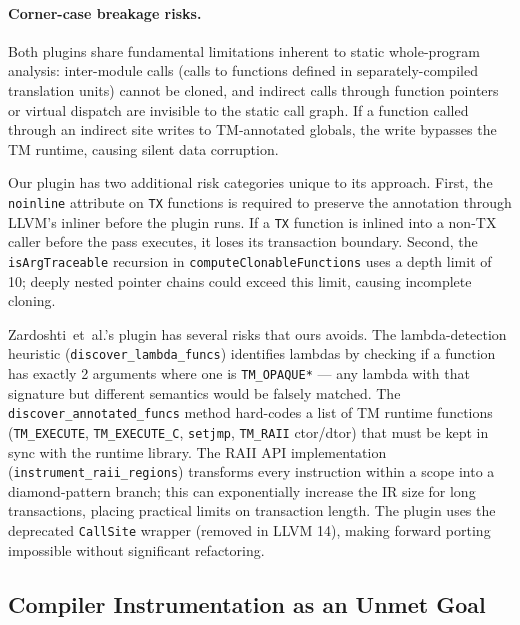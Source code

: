 \documentclass[article,12pt]{article}
\newcommand{\ZardoshtiEtAl}{Zardoshti~et~al.}
\begin{document}
\paragraph{Corner-case breakage risks.}
Both plugins share fundamental limitations inherent to static whole-program
analysis: inter-module calls (calls to functions defined in separately-compiled
translation units) cannot be cloned, and indirect calls through function
pointers or virtual dispatch are invisible to the static call graph.  If a
function called through an indirect site writes to TM-annotated globals, the
write bypasses the TM runtime, causing silent data corruption.

Our plugin has two additional risk categories unique to its approach.
First, the \texttt{noinline} attribute on \texttt{TX} functions is required
to preserve the annotation through LLVM's inliner before the plugin runs.
If a \texttt{TX} function is inlined into a non-TX caller before the pass
executes, it loses its transaction boundary.  Second, the
\texttt{isArgTraceable} recursion in \texttt{computeClonableFunctions} uses
a depth limit of 10; deeply nested pointer chains could exceed this limit,
causing incomplete cloning.

\ZardoshtiEtAl's plugin has several risks that ours avoids.  The lambda-detection
heuristic (\texttt{discover\_lambda\_funcs}) identifies lambdas by checking
if a function has exactly 2 arguments where one is \texttt{TM\_OPAQUE*} ---
any lambda with that signature but different semantics would be falsely
matched.  The \texttt{discover\_annotated\_funcs} method hard-codes a list
of TM runtime functions (\texttt{TM\_EXECUTE}, \texttt{TM\_EXECUTE\_C},
\texttt{setjmp}, \texttt{TM\_RAII} ctor/dtor) that must be kept in sync
with the runtime library.  The RAII API implementation
(\texttt{instrument\_raii\_regions}) transforms every instruction within
a scope into a diamond-pattern branch; this can exponentially increase
the IR size for long transactions, placing practical limits on transaction
length.  The plugin uses the deprecated \texttt{CallSite} wrapper (removed
in LLVM 14), making forward porting impossible without significant
refactoring.

\subsection{Compiler Instrumentation as an Unmet Goal}
\end{document}
